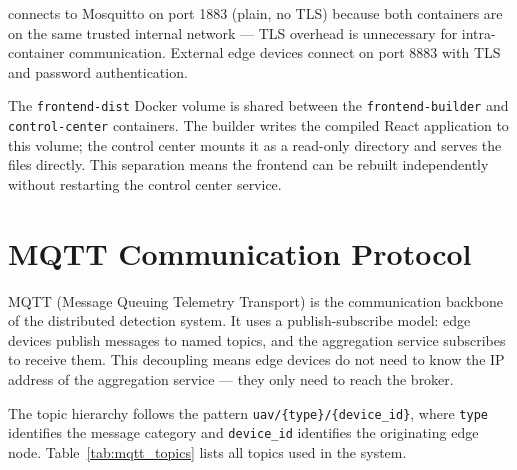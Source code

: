 \documentclass[12pt,a4paper]{report}
\begin{document}
connects to Mosquitto on port 1883 (plain, no TLS) because both containers
are on the same trusted internal network --- TLS overhead is unnecessary for
intra-container communication. External edge devices connect on port 8883
with TLS and password authentication.

The \texttt{frontend-dist} Docker volume is shared between the
\texttt{frontend-builder} and \texttt{control-center} containers. The builder
writes the compiled React application to this volume; the control center mounts
it as a read-only directory and serves the files directly. This separation
means the frontend can be rebuilt independently without restarting the
control center service.

\section{MQTT Communication Protocol}

MQTT (Message Queuing Telemetry Transport) is the communication backbone of
the distributed detection system. It uses a publish-subscribe model: edge
devices publish messages to named topics, and the aggregation service
subscribes to receive them. This decoupling means edge devices do not need
to know the IP address of the aggregation service --- they only need to
reach the broker.

The topic hierarchy follows the pattern \texttt{uav/\{type\}/\{device\_id\}},
where \texttt{type} identifies the message category and \texttt{device\_id}
identifies the originating edge node. Table~\ref{tab:mqtt_topics} lists all
topics used in the system.
\end{document}
